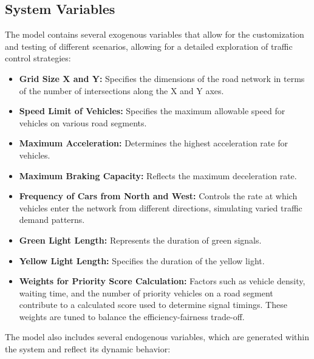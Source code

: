 \documentclass[sigconf]{acmart}
\begin{document}
\subsection{System Variables}
\label{variables}

The model contains several exogenous variables that allow for the customization and testing of different scenarios, allowing for a detailed exploration of traffic control strategies:


\begin{itemize}
    \item \textbf{Grid Size X and Y:} Specifies the dimensions of the road network in terms of the number of intersections along the X and Y axes.
    \item \textbf{Speed Limit of Vehicles:} Specifies the maximum allowable speed for vehicles on various road segments.
    \item \textbf{Maximum Acceleration:} Determines the highest acceleration rate for vehicles.
    \item \textbf{Maximum Braking Capacity:} Reflects the maximum deceleration rate.
    \item \textbf{Frequency of Cars from North and West:} Controls the rate at which vehicles enter the network from different directions, simulating varied traffic demand patterns.
    \item \textbf{Green Light Length:} Represents the duration of green signals.
    \item \textbf{Yellow Light Length:} Specifies the duration of the yellow light.
    \item \textbf{Weights for Priority Score Calculation:} Factors such as vehicle density, waiting time, and the number of priority vehicles on a road segment contribute to a calculated score used to determine signal timings. These weights are tuned to balance the efficiency-fairness trade-off.
\end{itemize}

The model also includes several endogenous variables, which are generated within the system and reflect its dynamic behavior:
\end{document}
